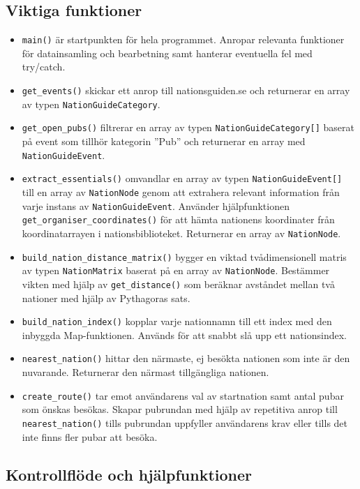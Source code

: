 \documentclass[a4paper, 12pt]{article}
\begin{document}
    \subsection{Viktiga funktioner}
    \label{subsec: viktiga_func}
        \begin{itemize}
            \item \texttt{main()} är startpunkten för hela programmet. Anropar relevanta funktioner för datainsamling och bearbetning samt hanterar eventuella fel med try/catch.
            \item \texttt{get\_events()} skickar ett anrop till nationsguiden.se och returnerar en array av typen \texttt{NationGuideCategory}.
            \item \texttt{get\_open\_pubs()} filtrerar en array av typen \texttt{NationGuideCategory[]} baserat på event som tillhör kategorin ''Pub'' och returnerar en array med \texttt{NationGuideEvent}.
            \item \texttt{extract\_essentials()} omvandlar en array av typen \texttt{{}NationGuideEvent[]} till en array av \texttt{NationNode} genom att extrahera relevant information från varje instans av \texttt{NationGuideEvent}. Använder hjälpfunktionen \texttt{get\_organiser\_coordinates()} för att hämta nationens koordinater från koordinatarrayen i nationsbiblioteket. Returnerar en array av \texttt{NationNode}.
            \item \texttt{build\_nation\_distance\_matrix()} bygger en viktad tvådimensionell matris av typen \texttt{NationMatrix} baserat på en array av \texttt{NationNode}. Bestämmer vikten med hjälp av \texttt{get\_distance()} som beräknar avståndet mellan två nationer med hjälp av Pythagoras sats.
            \item \texttt{build\_nation\_index()} kopplar varje nationnamn till ett index med den inbyggda Map-funktionen. Används för att snabbt slå upp ett nationsindex.
            \item \texttt{nearest\_nation()} hittar den närmaste, ej besökta nationen som inte är den nuvarande. Returnerar den närmast tillgängliga nationen.
            \item \texttt{create\_route()} tar emot användarens val av startnation samt antal pubar som önskas besökas. Skapar pubrundan med hjälp av repetitiva anrop till \texttt{nearest\_nation()} tills pubrundan uppfyller användarens krav eller tills det inte finns fler pubar att besöka.
        \end{itemize}

    \subsection{Kontrollflöde och hjälpfunktioner}
    \label{subsec: flöde}
\end{document}
